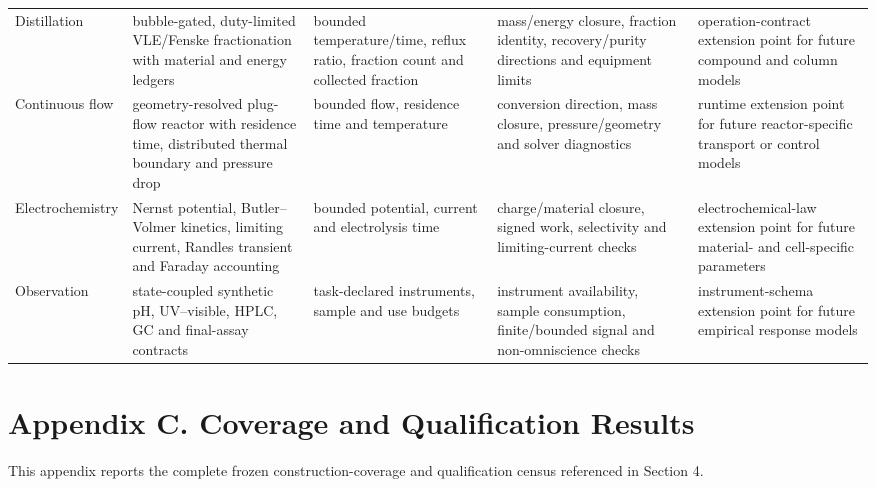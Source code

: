 \documentclass[10pt,twocolumn]{article}
\begin{document}
\begin{@twocolumnfalse}
\begin{tabularx}{\textwidth}{@{}L{0.125\textwidth}L{0.185\textwidth}L{0.18\textwidth}L{0.20\textwidth}Y@{}}
Distillation & bubble-gated, duty-limited VLE/Fenske fractionation with material and energy ledgers & bounded temperature/time, reflux ratio, fraction count and collected fraction & mass/energy closure, fraction identity, recovery/purity directions and equipment limits & operation-contract extension point for future compound and column models \\
Continuous flow & geometry-resolved plug-flow reactor with residence time, distributed thermal boundary and pressure drop & bounded flow, residence time and temperature & conversion direction, mass closure, pressure/geometry and solver diagnostics & runtime extension point for future reactor-specific transport or control models \\
Electrochemistry & Nernst potential, Butler--Volmer kinetics, limiting current, Randles transient and Faraday accounting & bounded potential, current and electrolysis time & charge/material closure, signed work, selectivity and limiting-current checks & electrochemical-law extension point for future material- and cell-specific parameters \\
Observation & state-coupled synthetic pH, UV--visible, HPLC, GC and final-assay contracts & task-declared instruments, sample and use budgets & instrument availability, sample consumption, finite/bounded signal and non-omniscience checks & instrument-schema extension point for future empirical response models \\
\bottomrule
\end{tabularx}
\par\medskip
\section{Appendix C. Coverage and Qualification Results}\label{appendix-c}
\noindent This appendix reports the complete frozen construction-coverage and qualification census referenced in Section 4.

\end{@twocolumnfalse}
\end{document}
